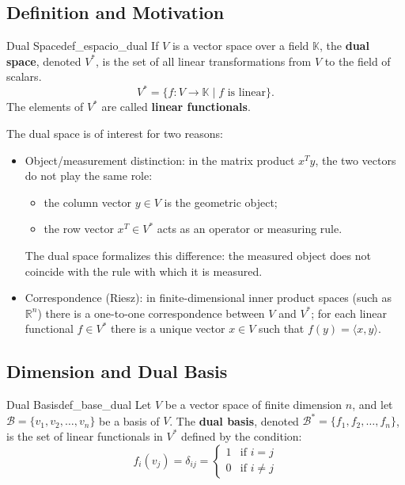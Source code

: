 \documentclass[11pt, a4paper]{article}
\begin{document}
\subsection{Definition and Motivation}

\begin{definicion}{Dual Space}{def_espacio_dual}
If $V$ is a vector space over a field $\mathbb{K}$, the \textbf{dual space}, denoted $V^*$, is the set of all linear transformations from $V$ to the field of scalars.
\[
V^* = \{ f: V \to \mathbb{K} \mid f \text{ is linear} \}.
\]
The elements of $V^*$ are called \textbf{linear functionals}.
\end{definicion}

The dual space is of interest for two reasons:

\begin{itemize}
    \item Object/measurement distinction: in the matrix product $x^T y$, the two vectors do not play the same role:
    \begin{itemize}
        \item the column vector $y \in V$ is the geometric object;
        \item the row vector $x^T \in V^*$ acts as an operator or measuring rule.
    \end{itemize}
    The dual space formalizes this difference: the measured object does not coincide with the rule with which it is measured.

    \item Correspondence (Riesz): in finite-dimensional inner product spaces (such as $\mathbb{R}^n$) there is a one-to-one correspondence between $V$ and $V^*$; for each linear functional $f \in V^*$ there is a unique vector $x \in V$ such that $f(y) = \langle x, y \rangle$.
\end{itemize}

\subsection{Dimension and Dual Basis}

\begin{definicion}{Dual Basis}{def_base_dual}
Let $V$ be a vector space of finite dimension $n$, and let $\mathcal{B} = \{v_1, v_2, \dots, v_n\}$ be a basis of $V$. 
The \textbf{dual basis}, denoted $\mathcal{B}^* = \{f_1, f_2, \dots, f_n\}$, is the set of linear functionals in $V^*$ defined by the condition:
\[
f_i(v_j) = \delta_{ij} = \begin{cases} 
1 & \text{if } i = j \\
0 & \text{if } i \neq j
\end{cases}
\]
\end{definicion}
\end{document}
